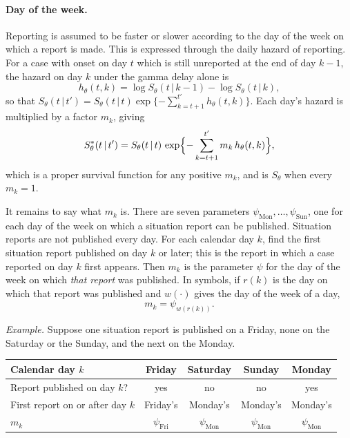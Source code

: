 \documentclass[11pt,a4paper]{article}
\newcommand{\given}{\,|\,}
\begin{document}
\paragraph{Day of the week.} Reporting is assumed to be faster or slower according to the
day of the week on which a report is made. This is expressed through the
daily hazard of reporting. For a case with onset on day $t$ which is still
unreported at the end of day $k-1$, the hazard on day $k$ under the gamma
delay alone is
\begin{equation}\label{eq:hazard}
h_\theta(t,k)=\log S_\theta(t\given k-1)-\log S_\theta(t\given k),
\end{equation}
so that $S_\theta(t\given t')=S_\theta(t\given t)\exp\{-\sum_{k=t+1}^{t'}h_\theta(t,k)\}$.
Each day's hazard is multiplied by a factor $m_k$, giving
\begin{equation}\label{eq:Seffective}
S^{*}_\theta(t\given t') = S_\theta(t\given t)\,
\exp\Bigl\{-\sum_{k=t+1}^{t'} m_k\,h_\theta(t,k)\Bigr\},
\end{equation}
which is a proper survival function for any positive $m_k$, and is $S_\theta$
when every $m_k=1$.

It remains to say what $m_k$ is. There are seven parameters
$\psi_{\text{Mon}},\dots,\psi_{\text{Sun}}$, one for each day of the week on
which a situation report can be published. Situation reports are not
published every day. For each calendar day $k$, find the first situation
report published on day $k$ or later; this is the report in which a case
reported on day $k$ first appears. Then $m_k$ is the parameter $\psi$ for the
day of the week on which \emph{that report} was published. In symbols, if
$r(k)$ is the day on which that report was published and $w(\cdot)$ gives the
day of the week of a day,
\begin{equation}\label{eq:multiplier}
m_k=\psi_{w(r(k))}.
\end{equation}

\emph{Example.} Suppose one situation report is published on a Friday, none
on the Saturday or the Sunday, and the next on the Monday.

\begin{center}
\begin{tabular}{lcccc}
\toprule
Calendar day $k$ & Friday & Saturday & Sunday & Monday \\
\midrule
Report published on day $k$? & yes & no & no & yes \\
First report on or after day $k$ & Friday's & Monday's & Monday's & Monday's \\
$m_k$ & $\psi_{\text{Fri}}$ & $\psi_{\text{Mon}}$ & $\psi_{\text{Mon}}$ & $\psi_{\text{Mon}}$ \\
\bottomrule
\end{tabular}
\end{center}
\end{document}
